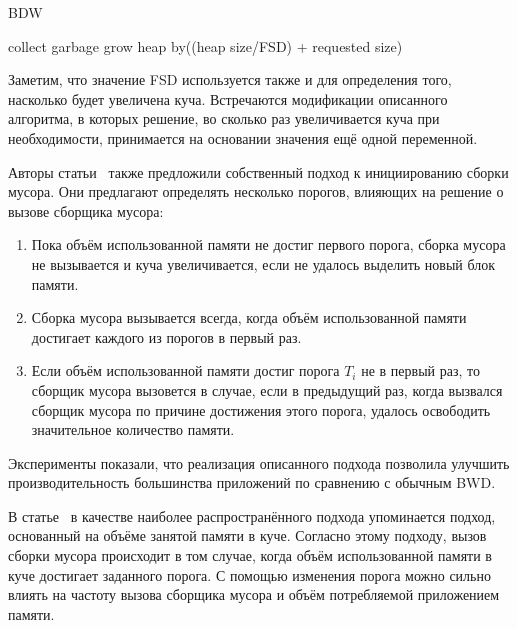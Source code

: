 \begin{algorithm}[hbt]
\caption{BDW}
\label{BDW-algo}
\begin{algorithmic}[1]
        \State collect garbage
    \Else 
        \State grow heap by((heap size/FSD) + requested size)
    \EndIf
\EndIf
\end{algorithmic}
\end{algorithm}

Заметим, что значение FSD используется также и для определения того, насколько будет увеличена куча.
Встречаются модификации описанного алгоритма, в которых решение, во сколько раз увеличивается куча
при необходимости, принимается на основании значения ещё одной переменной.

Авторы статьи~\cite{BDW} также предложили собственный подход к инициированию сборки мусора.
Они предлагают определять несколько порогов, влияющих на решение о вызове сборщика мусора:
\begin{enumerate}
\item{Пока объём использованной памяти не достиг первого порога, сборка мусора не вызывается и куча
увеличивается, если не удалось выделить новый блок памяти.}
\item{Сборка мусора вызывается всегда, когда объём использованной памяти достигает каждого из
порогов в первый раз.}
\item{Если объём использованной памяти достиг порога $T_i$ не в первый раз, то сборщик мусора
вызовется в случае, если в предыдущий раз, когда вызвался сборщик мусора по причине
достижения этого порога, удалось освободить
значительное количество памяти.}

\end{enumerate}


Эксперименты показали, что реализация описанного подхода позволила улучшить производительность 
большинства приложений по сравнению с обычным BWD.


В статье~\cite{microphase} в качестве наиболее распространённого подхода упоминается 
подход, основанный на объёме занятой памяти в куче.
Согласно этому подходу, вызов сборки мусора происходит в том случае,
когда объём использованной памяти в куче достигает заданного порога. С помощью
изменения порога можно сильно влиять на частоту вызова сборщика мусора и объём потребляемой приложением
памяти.

